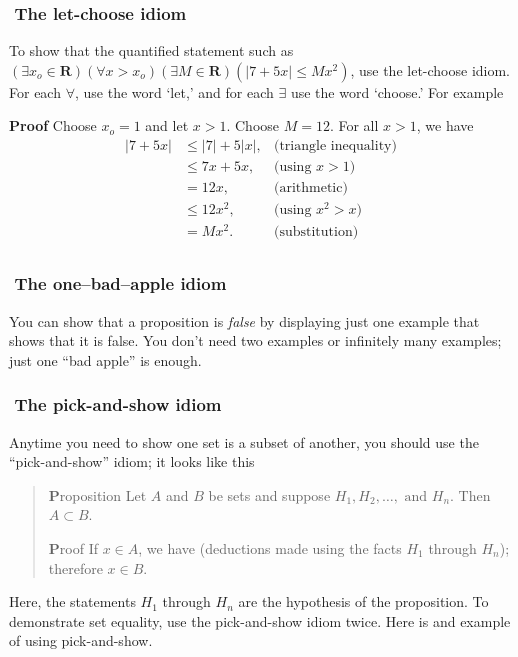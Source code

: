 \documentclass[12pt,fleqn]{article}
\newcommand{\reals}{\mathbf{R}}
\newcounter{ex}\setcounter{ex}{0}
\newcounter{id}\setcounter{id}{0}
\newcommand{\id}{%
\hspace{-0.2in} \setcounter{id}{\value{id}+1}
\theid \,\,}
\newcounter{se}\setcounter{se}{0}
\begin{document}
\subsubsection*{\id The let-choose idiom}

To show that the quantified statement such as \(\left(\exists x_o \in \reals \right) \left(\forall x > x_o\right) 
\left(\exists M \in \reals \right)  \left(|7 + 5 x| \leq M x^2\right)\),
use the let-choose idiom. For each \(\forall\), use the word `let,' and for each \(\exists\) use the word `choose.' For example

\textbf{Proof} Choose \(x_o = 1\) and let \(x > 1\). Choose \(M = 12\). For all \(x > 1\), we have
\begin{align*}
  |7 + 5 x| &\leq |7| + 5 |x|, &\mbox{(triangle inequality)} \\
            &\leq 7 x + 5 x,   &\mbox{(using } x > 1) \\
            &= 12 x,        &\mbox{(arithmetic)} \\
            &\leq 12 x^2,   &\mbox{(using } x^2 > x) \\
            &= M x^2.       &\mbox{(substitution)} \\
\end{align*}



\subsubsection*{\id The one--bad--apple idiom}

You can show that a proposition is {\em false\/} by displaying just
one example that shows that it is false. You don't need two examples
or infinitely many examples; just one ``bad apple'' is enough.  





\subsubsection*{\id The pick-and-show idiom}

Anytime you need to show one set is a subset of another, you should use the
``pick-and-show'' idiom; it looks like this

\begin{quote}

{ \textbf Proposition} Let \(A\) and \(B\) be sets and suppose \(H_1, H_2 , \dots
,\mbox{ and } H_n\). Then  \(A \subset B\).

\vspace{0.1in}

{ \textbf Proof} If \(x \in A\), we have (deductions made using the 
facts \(H_1\) through \(H_n\)); therefore \(x \in B\).

\end{quote}
Here, the statements \(H_1\) through \(H_n\) are the hypothesis of the
proposition. To demonstrate set equality, use the pick-and-show idiom twice. Here
is and example of using pick-and-show.
\end{document}
